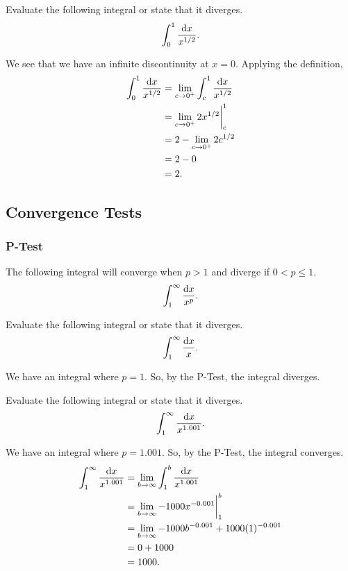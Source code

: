 \begin{example}
	Evaluate the following integral or state that it diverges.
	\begin{equation*}
		\int_{0}^{1}{\frac{\mathrm{d} x}{x^{1/2}}}.
	\end{equation*}
\end{example}
We see that we have an infinite discontinuity at $x=0$.
Applying the definition,
\begin{align*}
	\int_{0}^{1}{\frac{\mathrm{d} x}{x^{1/2}}} &= \lim_{c\to 0^+}{\int_{c}^{1}{\frac{\mathrm{d} x}{x^{1/2}}}} \\
	&= \lim_{c\to 0^+}{2x^{1/2}\biggr\rvert_{c}^{1}} \\
	&= 2 - \lim_{c\to 0^+}{2c^{1/2}} \\
	&= 2 - 0 \\
	&= 2.
\end{align*}

\subsection{Convergence Tests}
\subsubsection{P-Test}
\begin{lemma}
	The following integral will converge when $p > 1$ and diverge if $0 < p \leq 1$.
	\begin{equation*}
		\int_{1}^{\infty}{\frac{\mathrm{d} x}{x^p}}.
	\end{equation*}
\end{lemma}

\begin{example}
	Evaluate the following integral or state that it diverges.
	\begin{equation*}
		\int_{1}^{\infty}{\frac{\mathrm{d} x}{x}}.
	\end{equation*}
\end{example}
We have an integral where $p=1$.
So, by the P-Test, the integral diverges.

\begin{example}
	Evaluate the following integral or state that it diverges.
	\begin{equation*}
		\int_{1}^{\infty}{\frac{\mathrm{d} x}{x^{1.001}}}.
	\end{equation*}
\end{example}
We have an integral where $p=1.001$.
So, by the P-Test, the integral converges.
\begin{align*}
	\int_{1}^{\infty}{\frac{\mathrm{d} x}{x^{1.001}}} &= \lim_{b\to\infty}{\int_{1}^{b}{\frac{\mathrm{d} x}{x^{1.001}}}} \\
	&= \lim_{b\to\infty}{-1000x^{-0.001}\biggr\rvert_{1}^{b}} \\
	&= \lim_{b\to\infty}{-1000b^{-0.001}} + 1000(1)^{-0.001} \\
	&= 0 + 1000 \\
	&= 1000.
\end{align*}

